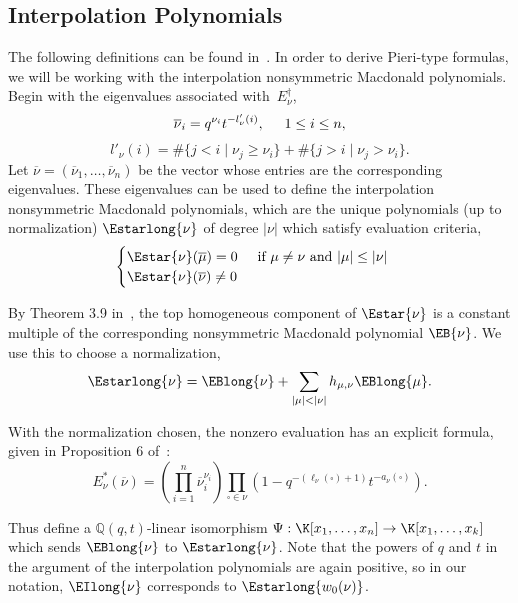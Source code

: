     \subsection{Interpolation Polynomials}
The following definitions can be found in~\cite{MR2525842}. In order to derive Pieri-type formulas, we will be working with the interpolation nonsymmetric Macdonald polynomials. Begin with the eigenvalues associated with~$E_\nu^\dagger$,
\begin{equation}\label{eigenvalueformula} \overline{\nu}_i = q^{\nu_i} t^{-l'_\nu(i)}, \hspace*{.5cm} 1\leq i \leq n,\end{equation}
\[ l'_\nu(i) = \# \{j<i \mid \nu_j \geq \nu_i\} + \# \{j>i \mid \nu_j > \nu_i\}.\]
Let $\overline{\nu} = (\overline{\nu}_1, \dotsc, \overline{\nu}_n)$ be the vector whose entries are the corresponding eigenvalues. These eigenvalues can be used to define the interpolation nonsymmetric Macdonald polynomials, which are the unique polynomials (up to normalization) $\Estarlong{\nu}$ of degree $| \nu |$ which satisfy evaluation criteria,
\begin{align}\label{vanishing} \begin{cases}\Estar{\nu}(\overline{\mu}) = 0  \hspace*{.5cm}\text{if } \mu \neq \nu \text{ and } |\mu| \leq |\nu|\\
\Estar{\nu}(\overline{\nu}) \neq 0
\end{cases}\end{align}

By Theorem 3.9 in~\cite{MR1456318}, the top homogeneous component of $\Estar{\nu}$ is a constant multiple of the corresponding nonsymmetric Macdonald polynomial $\EB{\nu}$. We use this to choose a normalization,
\[\Estarlong{\nu} = \EBlong{\nu} + \sum_{|\mu| < |\nu|} h_{\mu,\nu} \EBlong{\mu}.  \]

With the normalization chosen, the nonzero evaluation has an explicit formula, given in Proposition 6 of~\cite{MR2525842}:
 \begin{equation}\label{Estarformula} E^*_{\nu}(\overline{\nu}) = \left( \prod_{i=1}^n \overline{\nu}_i^{\nu_i} \right) \prod_{\square \in \nu} (1-q^{-(\ell_\nu(\square)+1)} t^{-a_\nu(\square)}).\end{equation}


Thus define a $\mathbb{Q}(q,t)$-linear isomorphism $\Psi:\K[x_1, \dotsc, x_n] \to \K[x_1, \dotsc, x_k]$ which sends $\EBlong{\nu}$ to $\Estarlong{\nu}$. Note that the powers of $q$ and $t$ in the argument of the interpolation polynomials are again positive, so in our notation, $\EIlong{\nu}$ corresponds to $\Estarlong{w_0(\nu)}$.

